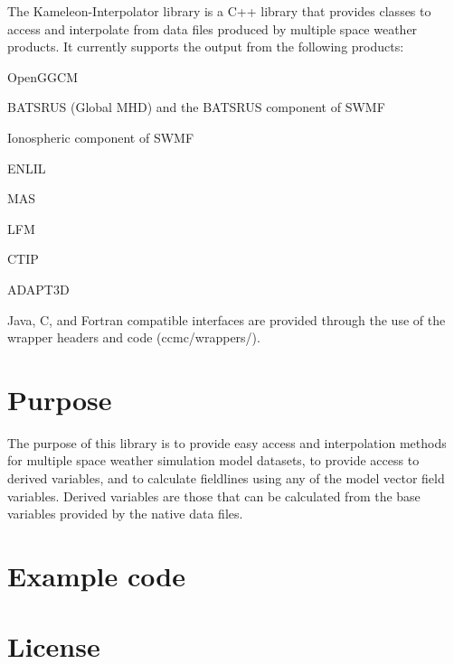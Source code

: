 The Kameleon-\/\-Interpolator library is a C++ library that provides classes to access and interpolate from data files produced by multiple space weather products. It currently supports the output from the following products\-:
\begin{DoxyItemize}
\item Open\-G\-G\-C\-M
\item B\-A\-T\-S\-R\-U\-S (Global M\-H\-D) and the B\-A\-T\-S\-R\-U\-S component of S\-W\-M\-F
\item Ionospheric component of S\-W\-M\-F
\item E\-N\-L\-I\-L
\item M\-A\-S
\item L\-F\-M
\item C\-T\-I\-P
\item A\-D\-A\-P\-T3\-D
\end{DoxyItemize}

Java, C, and Fortran compatible interfaces are provided through the use of the wrapper headers and code (ccmc/wrappers/).\hypertarget{index_Purpose}{}\section{Purpose}\label{index_Purpose}
The purpose of this library is to provide easy access and interpolation methods for multiple space weather simulation model datasets, to provide access to derived variables, and to calculate fieldlines using any of the model vector field variables. Derived variables are those that can be calculated from the base variables provided by the native data files.\hypertarget{index_Examples}{}\section{Example code}\label{index_Examples}
\hypertarget{index_License}{}\section{License}\label{index_License}
